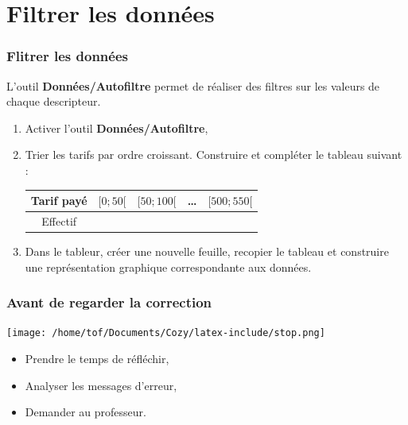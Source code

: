 \documentclass[svgnames,11pt]{beamer}
\begin{document}
\section{Filtrer les données}
\begin{frame}
    \frametitle{Flitrer les données}

    L’outil \textbf{Données/Autofiltre} permet de réaliser des filtres sur les valeurs de chaque descripteur.
    \begin{activite}
    \begin{enumerate}
        \item  Activer l'outil \textbf{Données/Autofiltre},
        \item Trier les tarifs par ordre croissant. Construire et compléter le tableau suivant :
        \begin{center}
            \begin{tabular}{|*{5}{c|}}
                \hline
                Tarif payé & $[0;50[$& $[50;100[$& \dots& $[500;550[$\\
                \hline
                Effectif&&&&\\
                \hline
            \end{tabular}
        \end{center}
        \item Dans le tableur, créer une nouvelle feuille, recopier le tableau et construire une représentation graphique correspondante aux données.
    \end{enumerate}
    \end{activite}

\end{frame}
\begin{frame}
    \frametitle{Avant de regarder la correction}
\begin{center}
    \centering
    \texttt{[image: /home/tof/Documents/Cozy/latex-include/stop.png]}
    \end{center}
{\Large
    \begin{itemize}
        \item Prendre le temps de réfléchir,
        \item Analyser les messages d'erreur,
        \item Demander au professeur.
    \end{itemize}
}
\end{frame}
\end{document}
